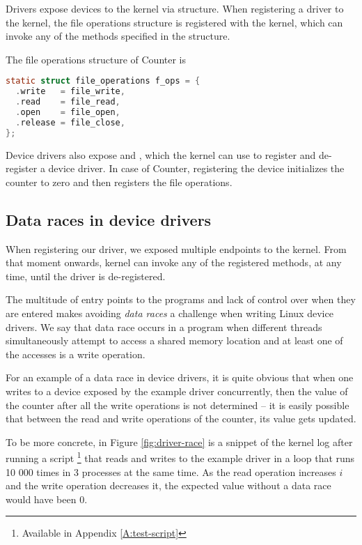 \documentclass[..thesis.tex]{subfiles}
\begin{document}
Drivers expose devices to the kernel via  structure. When registering a driver to the kernel,
the file operations structure is registered with the kernel, which can invoke any of the methods specified in the structure.

The file operations structure of Counter is 

\begin{lstlisting}[language=c,style=def]
static struct file_operations f_ops = {
  .write   = file_write,
  .read    = file_read,
  .open    = file_open,
  .release = file_close,
};
\end{lstlisting}

Device drivers also expose  and , which the kernel can use to register and de-register a device driver. In case of Counter,
registering the device initializes the counter  to zero and then registers the file operations. 

\subsection{Data races in device drivers}

When registering our driver, we exposed multiple endpoints to the kernel. From that moment onwards, kernel can invoke any of the registered methods,
at any time, until the driver is de-registered. 


The multitude of entry points to the programs and lack of control over when they are entered makes avoiding \textit{data races} a challenge when writing Linux device drivers.
We say that data race occurs in a program when different threads simultaneously attempt to access a shared memory location and at least one of the accesses is a
write operation.

For an example of a data race in device drivers, it is quite obvious that when one writes to a device exposed by the example driver concurrently,
then the value of the counter after all the write operations is not determined -- it is easily possible that between the read and write operations of the counter, its value gets updated.

To be more concrete, in Figure \ref{fig:driver-race} is a snippet of the kernel log after running a script \footnote{Available in Appendix \ref{A:test-script}}
that reads and writes to the example driver in a loop that runs 10 000 times in 3 processes at the same time.
As the read operation increases $i$ and the write operation decreases it, the expected value without a data race would have been $0$.
\end{document}
